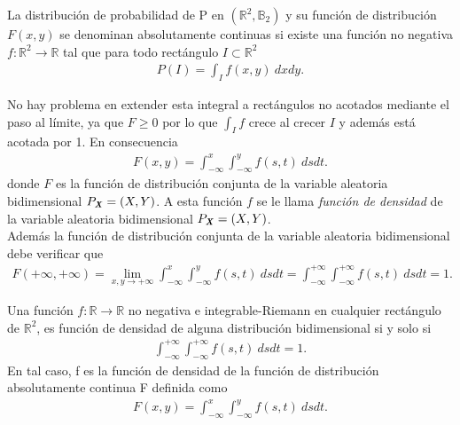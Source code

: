 \begin{defi}
La distribución de probabilidad de P en $(\mathbb{R}^2, \mathbb{B}_2)$ y su función de distribución $F(x,y)$ se denominan absolutamente continuas si existe una función no negativa $f: \mathbb{R}^2 \longrightarrow \mathbb{R}$ tal que para todo rectángulo $I \subset \mathbb{R}^2$
\begin{align*}
    P(I) = \int_{I}{f(x,y) \ dxdy}.
\end{align*}
\end{defi}
No hay problema en extender esta integral a rectángulos no acotados mediante el paso al límite, ya que $F \ge 0$ por lo que $\int_{I}{f}$ crece al crecer $I$ y además está acotada por 1. En consecuencia
\begin{align*}
    F(x,y) = \int_{-\infty}^{x}{\int_{-\infty}^{y}{f(s,t) \ dsdt}}.
\end{align*}
donde $F$ es la función de distribución conjunta de la variable aleatoria bidimensional $P_{\textbf{\textit{X}}} = (X,Y)$. A esta función $f$ se le llama \textit{función de densidad} de la variable aleatoria bidimensional $P_{\textbf{\textit{X}}} = (X,Y)$.
\\
\newline
Además la función de distribución conjunta de la variable aleatoria bidimensional debe verificar que
\begin{align*}
    F(+\infty, +\infty) = \lim_{x,y \to +\infty}\int_{-\infty}^{x}{\int_{-\infty}^{y}{f(s,t) \ dsdt}} = {\int_{-\infty}^{+\infty}{\int_{-\infty}^{+\infty}{f(s,t) \ dsdt}}} = 1.
\end{align*}

\begin{prop}
Una función $f: \mathbb{R} \longrightarrow \mathbb{R}$ no negativa e integrable-Riemann en cualquier rectángulo de $\mathbb{R}^2$, es función de densidad de alguna distribución bidimensional si y solo si
\begin{align*}
    {\int_{-\infty}^{+\infty}{\int_{-\infty}^{+\infty}{f(s,t) \ dsdt}}} = 1.
\end{align*}
En tal caso, f es la función de densidad de la función de distribución absolutamente continua F definida como
\begin{align*}
    F(x,y) = \int_{-\infty}^{x}{\int_{-\infty}^{y}{f(s,t) \ dsdt}}.
\end{align*}
\end{prop}

